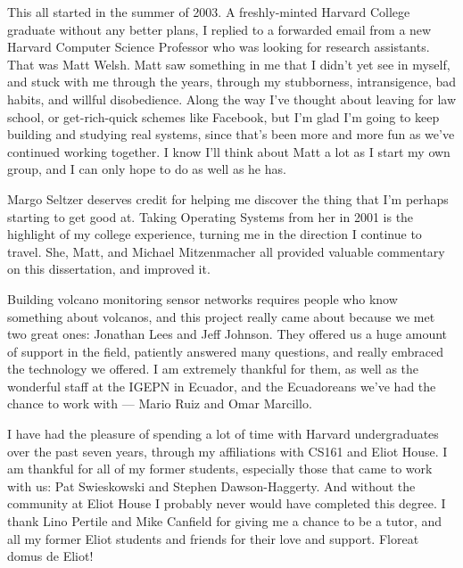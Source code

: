 This all started in the summer of 2003. A freshly-minted Harvard College
graduate without any better plans, I replied to a forwarded email from a new
Harvard Computer Science Professor who was looking for research assistants.
That was Matt Welsh. Matt saw something in me that I didn't yet see in
myself, and stuck with me through the years, through my stubborness,
intransigence, bad habits, and willful disobedience. Along the way I've
thought about leaving for law school, or get-rich-quick schemes like
Facebook, but I'm glad I'm going to keep building and studying real systems,
since that's been more and more fun as we've continued working together. I
know I'll think about Matt a lot as I start my own group, and I can only hope
to do as well as he has.

Margo Seltzer deserves credit for helping me discover the thing that I'm
perhaps starting to get good at. Taking Operating Systems from her in 2001 is
the highlight of my college experience, turning me in the direction I
continue to travel. She, Matt, and Michael Mitzenmacher all provided valuable
commentary on this dissertation, and improved it.

Building volcano monitoring sensor networks requires people who know
something about volcanos, and this project really came about because we met
two great ones: Jonathan Lees and Jeff Johnson. They offered us a huge amount
of support in the field, patiently answered many questions, and really
embraced the technology we offered. I am extremely thankful for them, as well
as the wonderful staff at the IGEPN in Ecuador, and the Ecuadoreans we've had
the chance to work with --- Mario Ruiz and Omar Marcillo.

I have had the pleasure of spending a lot of time with Harvard undergraduates
over the past seven years, through my affiliations with CS161 and Eliot
House. I am thankful for all of my former students, especially those that
came to work with us: Pat Swieskowski and Stephen Dawson-Haggerty. And
without the community at Eliot House I probably never would have completed
this degree. I thank Lino Pertile and Mike Canfield for giving me a chance to
be a tutor, and all my former Eliot students and friends for their love and
support. Floreat domus de Eliot!

